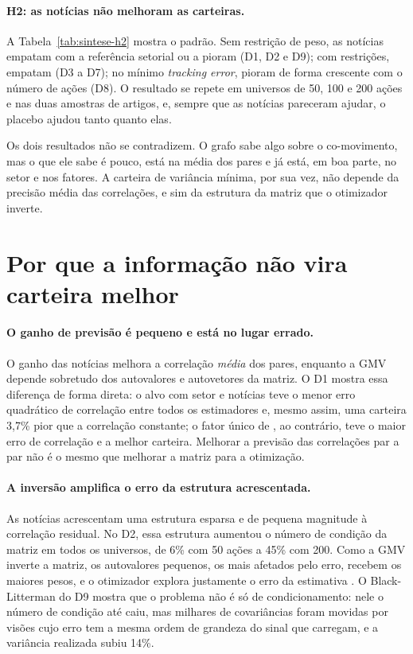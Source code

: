 \paragraph{H2: as notícias não melhoram as carteiras.} A Tabela~\ref{tab:sintese-h2} mostra o padrão. Sem
restrição de peso, as notícias empatam com a referência setorial ou a pioram (D1, D2 e D9); com
restrições, empatam (D3 a D7); no mínimo \emph{tracking error}, pioram de forma crescente com o número de
ações (D8). O resultado se repete em universos de 50, 100 e 200 ações e nas duas amostras de artigos, e,
sempre que as notícias pareceram ajudar, o placebo ajudou tanto quanto elas.

Os dois resultados não se contradizem. O grafo sabe algo sobre o co-movimento, mas o que ele sabe é
pouco, está na média dos pares e já está, em boa parte, no setor e nos fatores. A carteira de variância
mínima, por sua vez, não depende da precisão média das correlações, e sim da estrutura da matriz que o
otimizador inverte.

\section{Por que a informação não vira carteira melhor}
\label{sec:mecanismos}

\paragraph{O ganho de previsão é pequeno e está no lugar errado.} O ganho das notícias melhora a correlação
\emph{média} dos pares, enquanto a GMV depende sobretudo dos autovalores e autovetores da matriz. O D1
mostra essa diferença de forma direta: o alvo com setor e notícias teve o menor erro quadrático de
correlação entre todos os estimadores e, mesmo assim, uma carteira 3,7\% pior que a correlação constante; o
fator único de \citet{ledoit2003}, ao contrário, teve o maior erro de correlação e a melhor carteira.
Melhorar a previsão das correlações par a par não é o mesmo que melhorar a matriz para a otimização.

\paragraph{A inversão amplifica o erro da estrutura acrescentada.} As notícias acrescentam uma estrutura
esparsa e de pequena magnitude à correlação residual. No D2, essa estrutura aumentou o número de condição
da matriz em todos os universos, de 6\% com 50 ações a 45\% com 200. Como a GMV inverte a matriz, os
autovalores pequenos, os mais afetados pelo erro, recebem os maiores pesos, e o otimizador explora
justamente o erro da estimativa \citep{lopezdeprado2016}. O Black-Litterman do D9 mostra que o problema
não é só de condicionamento: nele o número de condição até caiu, mas milhares de covariâncias foram
movidas por visões cujo erro tem a mesma ordem de grandeza do sinal que carregam, e a variância realizada
subiu 14\%.

